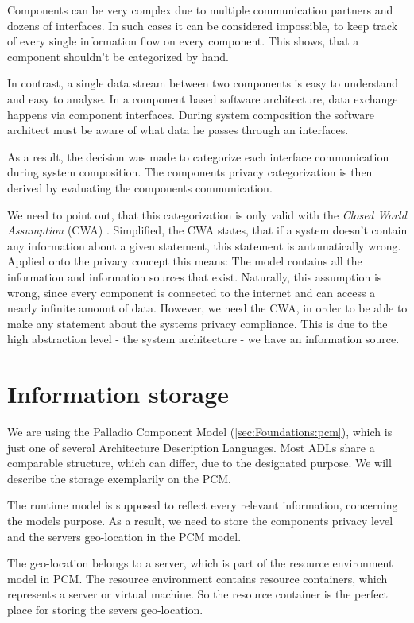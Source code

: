 Components can be very complex due to multiple communication partners and dozens of interfaces. In such cases it can be considered impossible, to keep track of every single information flow on every component. This shows, that a component shouldn't be categorized by hand.

In contrast, a single data stream between two components is easy to understand and easy to analyse. In a component based software architecture, data exchange happens via component interfaces. During system composition the software architect must be aware of what data he passes through an interfaces.

As a result, the decision was made to categorize each interface communication during system composition. The components privacy categorization is then derived by evaluating the components communication.

We need to point out, that this categorization is only valid with the \textit{Closed World Assumption} (CWA) \cite{Sequeda.CWA}. Simplified, the CWA states, that if a system doesn't contain any information about a given statement, this statement is automatically wrong. Applied onto the privacy concept this means: The model contains all the information and information sources that exist. Naturally, this assumption is wrong, since every component is connected to the internet and can access a nearly infinite amount of data. However, we need the CWA, in order to be able to make any statement about the systems privacy compliance. This is due to the high abstraction level - the system architecture - we have an information source.


\section{Information storage}
\label{sec:PrivacyConcept:pcm}

We are using the Palladio Component Model (\autoref{sec:Foundations:pcm}), which is just one of several Architecture Description Languages. Most ADLs share a comparable structure, which can differ, due to the designated purpose. We will describe the storage exemplarily on the PCM.

The runtime model is supposed to reflect every relevant information, concerning the models purpose. As a result, we need to store the components privacy level and the servers geo-location in the PCM model.

The geo-location belongs to a server, which is part of the resource environment model in PCM. The resource environment contains resource containers, which represents a server or virtual machine. So the resource container is the perfect place for storing the severs geo-location.

